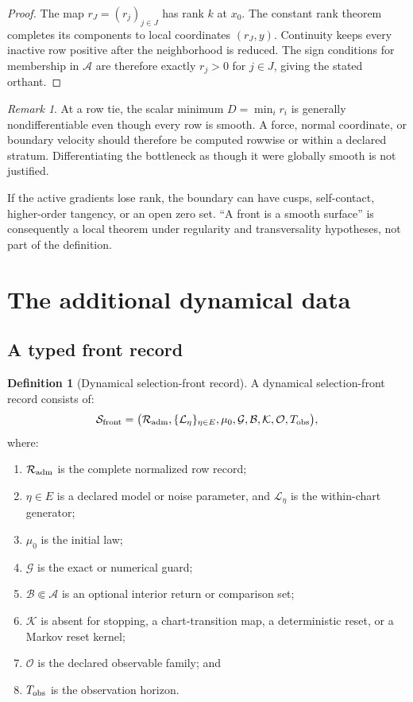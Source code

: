 \documentclass[11pt]{article}
\theoremstyle{definition}
\newtheorem{definition}[theorem]{Definition}
\theoremstyle{remark}
\newtheorem{remark}[theorem]{Remark}
\newcommand{\cA}{\mathcal A}
\newcommand{\cB}{\mathcal B}
\newcommand{\cG}{\mathcal G}
\newcommand{\cK}{\mathcal K}
\newcommand{\cL}{\mathcal L}
\newcommand{\cO}{\mathcal O}
\newcommand{\cR}{\mathcal R}
\newcommand{\cS}{\mathcal S}
\begin{document}
\begin{proof}
The map \(r_J=(r_j)_{j\in J}\) has rank \(k\) at \(x_0\).  The constant
rank theorem completes its components to local coordinates
\((r_J,y)\).  Continuity keeps every inactive row positive after the
neighborhood is reduced.  The sign conditions for membership in \(\cA\)
are therefore exactly \(r_j>0\) for \(j\in J\), giving the stated orthant.
\end{proof}

\begin{remark}
At a row tie, the scalar minimum \(D=\min_i r_i\) is generally
nondifferentiable even though every row is smooth.  A force, normal
coordinate, or boundary velocity should therefore be computed rowwise or
within a declared stratum.  Differentiating the bottleneck as though it
were globally smooth is not justified.
\end{remark}

If the active gradients lose rank, the boundary can have cusps,
self-contact, higher-order tangency, or an open zero set.  ``A front is a
smooth surface'' is consequently a local theorem under regularity and
transversality hypotheses, not part of the definition.

\section{The additional dynamical data}
\label{sec:dynamics}

\subsection{A typed front record}

\begin{definition}[Dynamical selection-front record]
\label{def:dynamicrecord}
A dynamical selection-front record consists of:
\[
 \cS_{\rm front}
 =
 \bigl(
 \cR_{\rm adm},
 \{\cL_\eta\}_{\eta\in E},
 \mu_0,
 \cG,
 \cB,
 \cK,
 \cO,
 T_{\rm obs}
 \bigr),
\]
where:
\begin{enumerate}[leftmargin=2em]
\item \(\cR_{\rm adm}\) is the complete normalized row record;
\item \(\eta\in E\) is a declared model or noise parameter, and
      \(\cL_\eta\) is the within-chart generator;
\item \(\mu_0\) is the initial law;
\item \(\cG\) is the exact or numerical guard;
\item \(\cB\Subset\cA\) is an optional interior return or comparison set;
\item \(\cK\) is absent for stopping, a chart-transition map, a
      deterministic reset, or a Markov reset kernel;
\item \(\cO\) is the declared observable family; and
\item \(T_{\rm obs}\) is the observation horizon.
\end{enumerate}
\end{definition}
\end{document}
